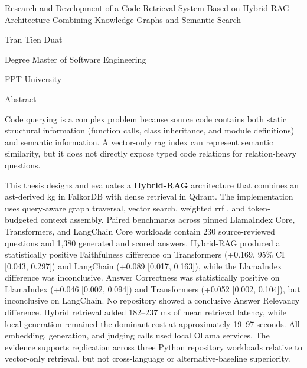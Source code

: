 \documentclass[12pt,letterpaper,oneside]{report}
\renewcommand{\headrulewidth}{0pt}
\renewcommand{\headrulewidth}{0pt}
\newcommand{\thesistitledisplay}{Research and Development of a Code Retrieval System Based on Hybrid-RAG Architecture Combining Knowledge Graphs and Semantic Search}
\newenvironment{physicalcenter}{%
    \par\noindent\hspace*{-18pt}\begin{minipage}[t]{\textwidth}\centering
}{%
    \end{minipage}\par
}
\newcommand{\frontmatterheadingleft}[1]{%
    {\raggedright\sffamily\fontsize{16}{19.2}\selectfont #1\par}
    \vspace{12pt}
}
\begin{document}
\clearpage
\thispagestyle{empty}
\setcounter{page}{1}
\fancypagestyle{plain}{%
    \fancyhf{}
    \renewcommand{\headrulewidth}{0pt}
}
\vspace*{-26pt}
\begin{physicalcenter}\begin{singlespace}
    {\sffamily\fontsize{16}{22}\selectfont \thesistitledisplay\par}
    \vspace{16pt}
    {\fontsize{12}{14.4}\selectfont Tran Tien Duat\par}
    \vspace{10pt}
    {\fontsize{12}{14.4}\selectfont Degree Master of Software Engineering\par}
    \vspace{10pt}
    {\fontsize{12}{14.4}\selectfont FPT University\par}
    \vspace{10pt}
    {\fontsize{12}{14.4}\par}
\end{singlespace}
\end{physicalcenter}
\vspace{12pt}
\frontmatterheadingleft{Abstract}
Code querying is a complex problem because source code contains both static structural information (function calls, class inheritance, and module definitions) and semantic information. A vector-only \gls{rag} index can represent semantic similarity, but it does not directly expose typed code relations for relation-heavy questions.

This thesis designs and evaluates a \textbf{Hybrid-RAG} architecture that combines an \gls{ast}-derived \gls{kg} in FalkorDB with dense retrieval in Qdrant. The implementation uses query-aware graph traversal, vector search, weighted \gls{rrf} \cite{cormack2009rrf}, and token-budgeted context assembly. Paired benchmarks across pinned LlamaIndex Core, Transformers, and LangChain Core workloads contain 230 source-reviewed questions and 1,380 generated and scored answers. Hybrid-RAG produced a statistically positive Faithfulness difference on Transformers (+0.169, 95\% CI [0.043, 0.297]) and LangChain (+0.089 [0.017, 0.163]), while the LlamaIndex difference was inconclusive. Answer Correctness was statistically positive on LlamaIndex (+0.046 [0.002, 0.094]) and Transformers (+0.052 [0.002, 0.104]), but inconclusive on LangChain. No repository showed a conclusive Answer Relevancy difference. Hybrid retrieval added 182--237 ms of mean retrieval latency, while local generation remained the dominant cost at approximately 19--97 seconds. All embedding, generation, and judging calls used local Ollama services. The evidence supports replication across three Python repository workloads relative to vector-only retrieval, but not cross-language or alternative-baseline superiority.
\end{document}
